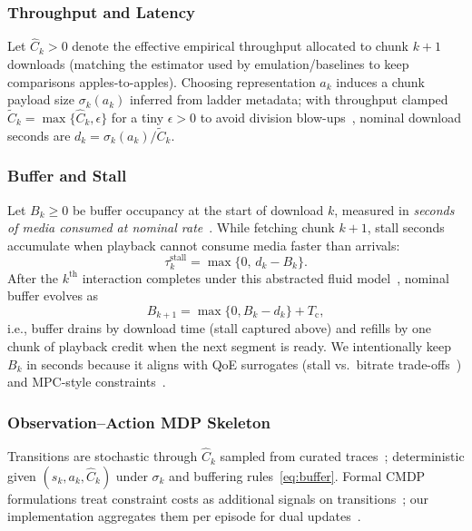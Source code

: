 \documentclass[preprint,12pt]{elsarticle}
\begin{document}
\subsubsection{Throughput and Latency}
Let \(\hat{C}_k>0\) denote the effective empirical throughput allocated to chunk \(k{+}1\) downloads (matching the estimator used by emulation/baselines to keep comparisons apples-to-apples).
Choosing representation \(a_k\) induces a chunk payload size \(\sigma_{k}(a_k)\) inferred from ladder metadata; with throughput clamped \(\tilde{C}_k=\max\{\hat{C}_k,\epsilon\}\) for a tiny \(\epsilon{>}0\) to avoid division blow-ups~\cite{yin2015control}, nominal download seconds are \(d_k=\sigma_{k}(a_k)/\tilde{C}_k\).

\subsubsection{Buffer and Stall}
Let \(B_k\ge 0\) be buffer occupancy at the start of download \(k\), measured in \emph{seconds of media consumed at nominal rate}~\cite{yin2015control,mao2017neural}.
While fetching chunk \(k{+}1\), stall seconds accumulate when playback cannot consume media faster than arrivals:
\begin{equation}
    \tau^{\mathrm{stall}}_k=\max\{0,\, d_k-B_k\}.
\end{equation}
After the \(k^{\text{th}}\) interaction completes under this abstracted fluid model~\cite{yin2015control}, nominal buffer evolves as
\begin{equation}
    \label{eq:buffer}
    B_{k+1}=\max\{0,B_k-d_k\}+T_{\mathrm{c}},
\end{equation}
i.e., buffer drains by download time (stall captured above) and refills by one chunk of playback credit when the next segment is ready.
We intentionally keep \(B_k\) in seconds because it aligns with QoE surrogates (stall vs.\ bitrate trade-offs~\cite{bentaleb2018survey}) and MPC-style constraints~\cite{yin2015control}.

\subsubsection{Observation--Action MDP Skeleton}
Transitions are stochastic through \(\hat{C}_k\) sampled from curated traces~\cite{bentaleb2018survey,fcc2015mba,kvalbein2014}; deterministic given \((s_k,a_k,\hat{C}_k)\) under \(\sigma_{k}\) and buffering rules~\eqref{eq:buffer}.
Formal CMDP formulations treat constraint costs as additional signals on transitions~\cite{altman1999constrained}; our implementation aggregates them per episode for dual updates~\cite{paternain2019dual}.
\end{document}
